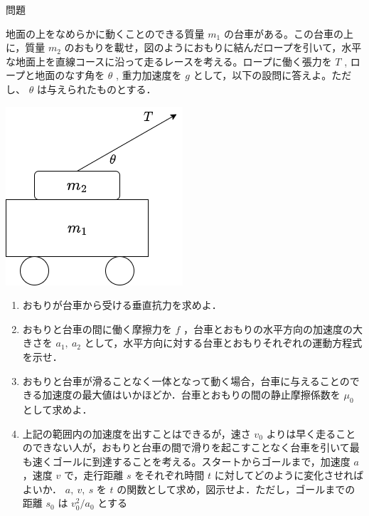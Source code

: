 \documentclass[
  b4paperpaper,
  xelatex,ja=standard]{bxjsbook}
\providecommand{\tightlist}{%
  \setlength{\itemsep}{0pt}\setlength{\parskip}{0pt}}\usepackage{longtable,booktabs,array}
\begin{document}
\begin{Qbox}{問題}

地面の上をなめらかに動くことのできる質量 \(m_1\)
の台車がある。この台車の上に，質量 \(m_2\)
のおもりを載せ，図のようにおもりに結んだロープを引いて，水平な地面上を直線コースに沿って走るレースを考える。ロープに働く張力を
\(T\) , ロープと地面のなす角を \(\theta\) , 重力加速度を \(g\)
として，以下の設問に答えよ。ただし、 \(\theta\) は与えられたものとする．

\includegraphics{source/images/newton/newton17.png}

\begin{enumerate}
\def\labelenumi{\arabic{enumi}.}
\tightlist
\item
  おもりが台車から受ける垂直抗力を求めよ．
\item
  おもりと台車の間に働く摩擦力を \(f\)
  ，台車とおもりの水平方向の加速度の大きさを \(a_1,\: a_2\)
  として，水平方向に対する台車とおもりそれぞれの運動方程式を示せ．
\item
  おもりと台車が滑ることなく一体となって動く場合，台車に与えることのできる加速度の最大値はいかほどか．台車とおもりの間の静止摩擦係数を
  \(\mu_0\) として求めよ．
\item
  上記の範囲内の加速度を出すことはできるが，速さ \(v_0\)
  よりは早く走ることのできない人が，おもりと台車の間で滑りを起こすことなく台車を引いて最も速くゴールに到達することを考える。スタートからゴールまで，加速度
  \(a\) ，速度 \(v\) で，走行距離 \(s\) をそれぞれ時間 \(t\)
  に対してどのように変化させればよいか． \(a,\:v,\: s\) を \(t\)
  の関数として求め，図示せよ．ただし，ゴールまでの距離 \(s_0\) は
  \(v_0^2/a_0\) とする
\end{enumerate}

\end{Qbox}

\end{document}
